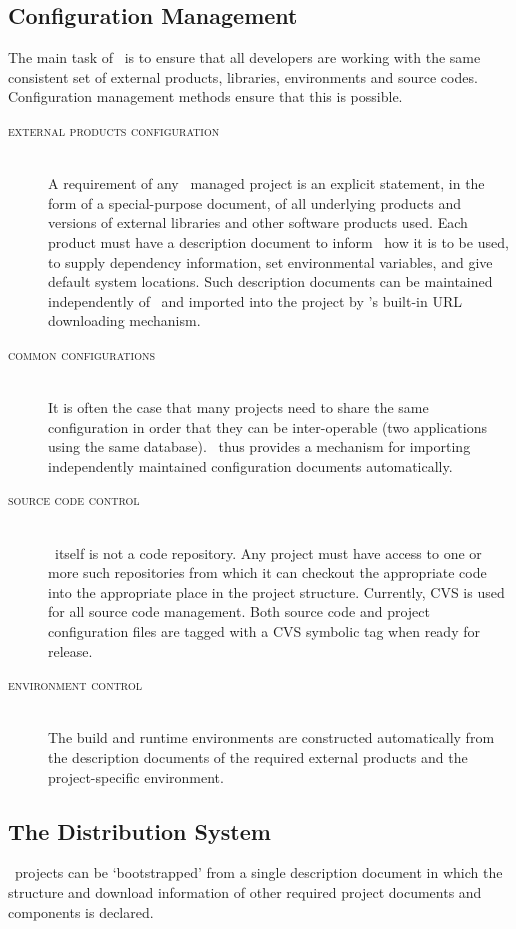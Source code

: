 \subsection{Configuration Management}\label{sec:cm}
The main task of \scram\ is to ensure that all developers are working
with the same consistent set of external products, libraries,
environments and source codes. Configuration management methods ensure
that this is possible.
\begin{description}     
\item [\textsc{external products configuration}]\mbox{}\\
  A requirement of any \scram\ managed project is an explicit
  statement, in the form of a special-purpose document, of all
  underlying products and versions of external libraries and other
  software products used. Each product must have a description
  document to inform \scram\ how it is to be used, to supply dependency
  information, set environmental variables, and give default system
  locations.  Such description documents can be maintained
  independently of \scram\ and imported into the project by
  \scram's built-in URL downloading mechanism.
\item[\textsc{common configurations}]\mbox{}\\
  It is often the case that many projects need to share the same
  configuration in order that they can be inter-operable (\eg two
  applications using the same database).  \scram\ thus provides a
  mechanism for importing independently maintained configuration
  documents automatically.
\item[\textsc{source code control}]\mbox{}\\
  \scram\ itself is not a code repository.  Any project must have
  access to one or more such repositories from which it can checkout
  the appropriate code into the appropriate place in the project
  structure. Currently, CVS is used for all source code management.
  Both source code and project configuration files are tagged with a
  CVS symbolic tag when ready for release.
\item[\textsc{environment control}]\mbox{}\\
  The build and runtime environments are constructed automatically
  from the description documents of the required external products and
  the project-specific environment.
\end{description}


\subsection{The Distribution System}\label{sec:dist}
\scram\ projects can be `bootstrapped' from a single description
document in which the structure and download information of other
required project documents and components is declared.

